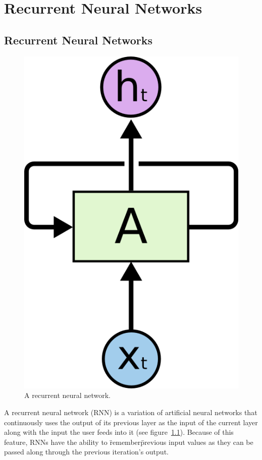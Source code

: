 \chapter{Recurrent Neural Networks}\label{ch:rnn}

\section{Recurrent Neural Networks}
\begin{figure}
	\begin{center}
		\includegraphics[scale=0.5]{rnn/rnn_rolled}
	\end{center}
	\caption{A recurrent neural network.\label{fig:rnn_img}}
\end{figure}

A recurrent neural network (RNN) is a variation of artificial neural networks that continuously uses the output of its previous layer as the input of the current layer along with the input the user feeds into it (see figure~\ref{fig:rnn_img}). Because of this feature, RNNs have the ability to \"remember\" previous input values as they can be passed along through the previous iteration's output. 

